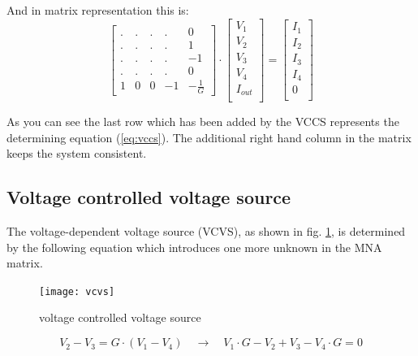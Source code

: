 And in matrix representation this is:
\begin{equation}
\begin{bmatrix}
.&.&.&.& 0\\
.&.&.&.& 1\\
.&.&.&.& -1\\
.&.&.&.& 0\\
1 & 0 & 0 & -1 & -\frac{1}{G}
\end{bmatrix}
\cdot
\begin{bmatrix}
V_{1}\\
V_{2}\\
V_{3}\\
V_{4}\\
I_{out}\\
\end{bmatrix}
=
\begin{bmatrix}
I_{1}\\
I_{2}\\
I_{3}\\
I_{4}\\
0\\
\end{bmatrix}
\end{equation}

As you can see the last row which has been added by the VCCS
represents the determining equation (\ref{eq:vccs}).  The additional
right hand column in the matrix keeps the system consistent.

\subsection{Voltage controlled voltage source}
\label{sec:vcvs}

The voltage-dependent voltage source (VCVS), as shown in fig.
\ref{fig:vcvs}, is determined by the following equation which
introduces one more unknown in the MNA matrix.

\begin{figure}[ht]
\begin{center}
\texttt{[image: vcvs]}
\end{center}
\caption{voltage controlled voltage source}
\label{fig:vcvs}
\end{figure}
\FloatBarrier

\begin{equation}
V_{2} - V_{3} = G\cdot \left(V_{1} - V_{4}\right)
\quad \rightarrow \quad
V_{1}\cdot G - V_{2} + V_{3} - V_{4}\cdot G = 0
\label{eq:vcvs}
\end{equation}

